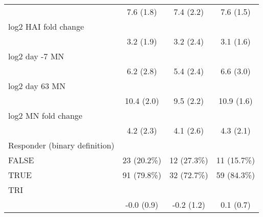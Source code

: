 \begin{table}[ ht! ]
\begin{tabular}{ l c c c }
 \hspace{6pt}   & 7.6 (1.8) & 7.4 (2.2) & 7.6 (1.5)\\ 
 log2 HAI fold change  &   &   &  \\ 
 \hspace{6pt}   & 3.2 (1.9) & 3.2 (2.4) & 3.1 (1.6)\\ 
 log2 day -7 MN  &   &   &  \\ 
 \hspace{6pt}   & 6.2 (2.8) & 5.4 (2.4) & 6.6 (3.0)\\ 
 log2 day 63 MN  &   &   &  \\ 
 \hspace{6pt}   & 10.4 (2.0) & 9.5 (2.2) & 10.9 (1.6)\\ 
 log2 MN fold change  &   &   &  \\ 
 \hspace{6pt}   & 4.2 (2.3) & 4.1 (2.6) & 4.3 (2.1)\\ 
 Responder (binary definition) &   &   &  \\ 
 \hspace{6pt}    FALSE & 23 (20.2\%) & 12 (27.3\%) & 11 (15.7\%)\\ 
 \hspace{6pt}    TRUE & 91 (79.8\%) & 32 (72.7\%) & 59 (84.3\%)\\ 
 TRI &   &   &  \\ 
 \hspace{6pt}   & -0.0 (0.9) & -0.2 (1.2) & 0.1 (0.7)\\ 
 \bottomrule
 
 \end{tabular}
 \end{table}
